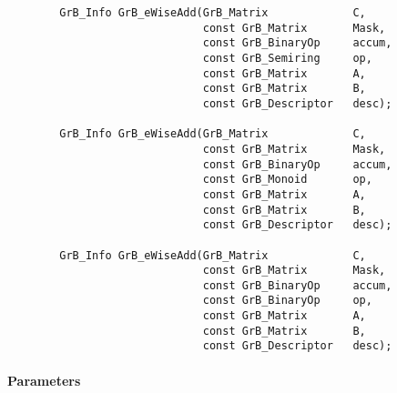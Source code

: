 \begin{verbatim}
        GrB_Info GrB_eWiseAdd(GrB_Matrix             C,
                              const GrB_Matrix       Mask,
                              const GrB_BinaryOp     accum,
                              const GrB_Semiring     op, 
                              const GrB_Matrix       A,
                              const GrB_Matrix       B,
                              const GrB_Descriptor   desc);
                            
        GrB_Info GrB_eWiseAdd(GrB_Matrix             C,
                              const GrB_Matrix       Mask,
                              const GrB_BinaryOp     accum,
                              const GrB_Monoid       op, 
                              const GrB_Matrix       A,
                              const GrB_Matrix       B,
                              const GrB_Descriptor   desc);
                            
        GrB_Info GrB_eWiseAdd(GrB_Matrix             C,
                              const GrB_Matrix       Mask,
                              const GrB_BinaryOp     accum,
                              const GrB_BinaryOp     op, 
                              const GrB_Matrix       A,
                              const GrB_Matrix       B,
                              const GrB_Descriptor   desc);
\end{verbatim}

\paragraph{Parameters}

